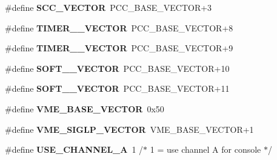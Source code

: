 \begin{DoxyCompactItemize}
\mbox{\label{group__RTEMSBSPsM68kMVME147s_ga3845de4996526e018ce7bfd88f92fbf9}} 
\#define {\bfseries S\+C\+C\+\_\+\+V\+E\+C\+T\+OR}~P\+C\+C\+\_\+\+B\+A\+S\+E\+\_\+\+V\+E\+C\+T\+OR+3
\item 
\mbox{\label{group__RTEMSBSPsM68kMVME147s_ga9ee5f7e8dd7e8e9e1c9d90aca3e49161}} 
\#define {\bfseries T\+I\+M\+E\+R\+\_\+\_\+\+V\+E\+C\+T\+OR}~P\+C\+C\+\_\+\+B\+A\+S\+E\+\_\+\+V\+E\+C\+T\+OR+8
\item 
\mbox{\label{group__RTEMSBSPsM68kMVME147s_gaa085cb113d808bd60103dd7586ba2500}} 
\#define {\bfseries T\+I\+M\+E\+R\+\_\+\_\+\+V\+E\+C\+T\+OR}~P\+C\+C\+\_\+\+B\+A\+S\+E\+\_\+\+V\+E\+C\+T\+OR+9
\item 
\mbox{\label{group__RTEMSBSPsM68kMVME147s_gae7a8712d92352bdfb75ced3209ae2095}} 
\#define {\bfseries S\+O\+F\+T\+\_\+\_\+\+V\+E\+C\+T\+OR}~P\+C\+C\+\_\+\+B\+A\+S\+E\+\_\+\+V\+E\+C\+T\+OR+10
\item 
\mbox{\label{group__RTEMSBSPsM68kMVME147s_ga27b5de1dbca6220daf904d4d3730d66e}} 
\#define {\bfseries S\+O\+F\+T\+\_\+\_\+\+V\+E\+C\+T\+OR}~P\+C\+C\+\_\+\+B\+A\+S\+E\+\_\+\+V\+E\+C\+T\+OR+11
\item 
\mbox{\label{group__RTEMSBSPsM68kMVME147s_ga70d7d933f02584ac897a787d92a6f770}} 
\#define {\bfseries V\+M\+E\+\_\+\+B\+A\+S\+E\+\_\+\+V\+E\+C\+T\+OR}~0x50
\item 
\mbox{\label{group__RTEMSBSPsM68kMVME147s_gad0cba850dd02cfbd8652964974e71f8e}} 
\#define {\bfseries V\+M\+E\+\_\+\+S\+I\+G\+L\+P\+\_\+\+V\+E\+C\+T\+OR}~V\+M\+E\+\_\+\+B\+A\+S\+E\+\_\+\+V\+E\+C\+T\+OR+1
\item 
\mbox{\label{group__RTEMSBSPsM68kMVME147s_ga62d3e1ecd14b8482d9bd5a0560371bc2}} 
\#define {\bfseries U\+S\+E\+\_\+\+C\+H\+A\+N\+N\+E\+L\+\_\+A}~1                /$\ast$ 1 = use channel A for console $\ast$/
\item 
\mbox{\label{group__RTEMSBSPsM68kMVME147s_ga4a14f6ceda7efc6e5701d1525acf09d0}} 

\end{DoxyCompactItemize}
